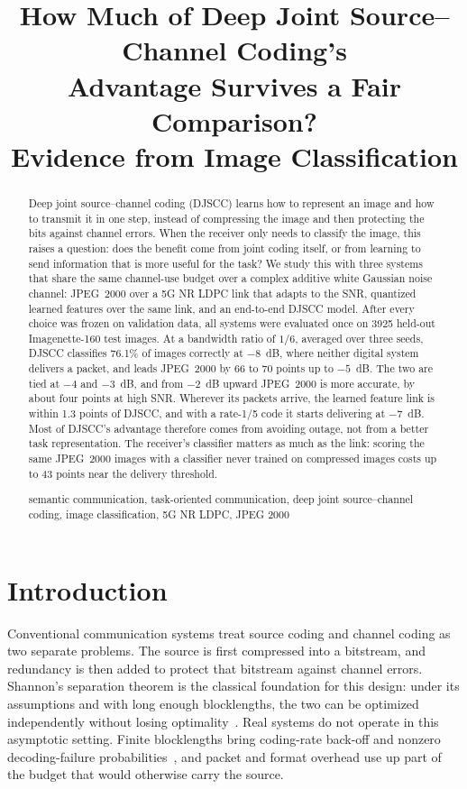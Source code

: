 \documentclass[conference]{IEEEtran}
\title{How Much of Deep Joint Source--Channel Coding's\\
Advantage Survives a Fair Comparison?\\
Evidence from Image Classification}
\author{
\IEEEauthorblockN{U. N. Kar, N. Ravi, S. Mukherjee, A. Mishra, T. Srivastava}
\IEEEauthorblockA{\textit{Vellore Institute of Technology, Andhra Pradesh, India}\\
nishchalravi05@gmail.com}
}
\begin{document}
\maketitle

\begin{abstract}
Deep joint source--channel coding (DJSCC) learns how to represent an image and how to transmit it in one step, instead of compressing the image and then protecting the bits against channel errors. When the receiver only needs to classify the image, this raises a question: does the benefit come from joint coding itself, or from learning to send information that is more useful for the task? We study this with three systems that share the same channel-use budget over a complex additive white Gaussian noise channel: JPEG~2000 over a 5G NR LDPC link that adapts to the SNR, quantized learned features over the same link, and an end-to-end DJSCC model. After every choice was frozen on validation data, all systems were evaluated once on 3925 held-out Imagenette-160 test images. At a bandwidth ratio of $1/6$, averaged over three seeds, DJSCC classifies 76.1\% of images correctly at $-8$~dB, where neither digital system delivers a packet, and leads JPEG~2000 by 66 to 70 points up to $-5$~dB. The two are tied at $-4$ and $-3$~dB, and from $-2$~dB upward JPEG~2000 is more accurate, by about four points at high SNR. Wherever its packets arrive, the learned feature link is within 1.3 points of DJSCC, and with a rate-1/5 code it starts delivering at $-7$~dB. Most of DJSCC's advantage therefore comes from avoiding outage, not from a better task representation. The receiver's classifier matters as much as the link: scoring the same JPEG~2000 images with a classifier never trained on compressed images costs up to 43 points near the delivery threshold.

\begin{IEEEkeywords}
semantic communication, task-oriented communication, deep joint source--channel coding, image classification, 5G NR LDPC, JPEG 2000
\end{IEEEkeywords}
\end{abstract}

\section{Introduction}
Conventional communication systems treat source coding and channel coding as two separate problems. The source is first compressed into a bitstream, and redundancy is then added to protect that bitstream against channel errors. Shannon's separation theorem is the classical foundation for this design: under its assumptions and with long enough blocklengths, the two can be optimized independently without losing optimality~\cite{shannon1948}. Real systems do not operate in this asymptotic setting. Finite blocklengths bring coding-rate back-off and nonzero decoding-failure probabilities~\cite{polyanskiy2010}, and packet and format overhead use up part of the budget that would otherwise carry the source.
\end{document}
